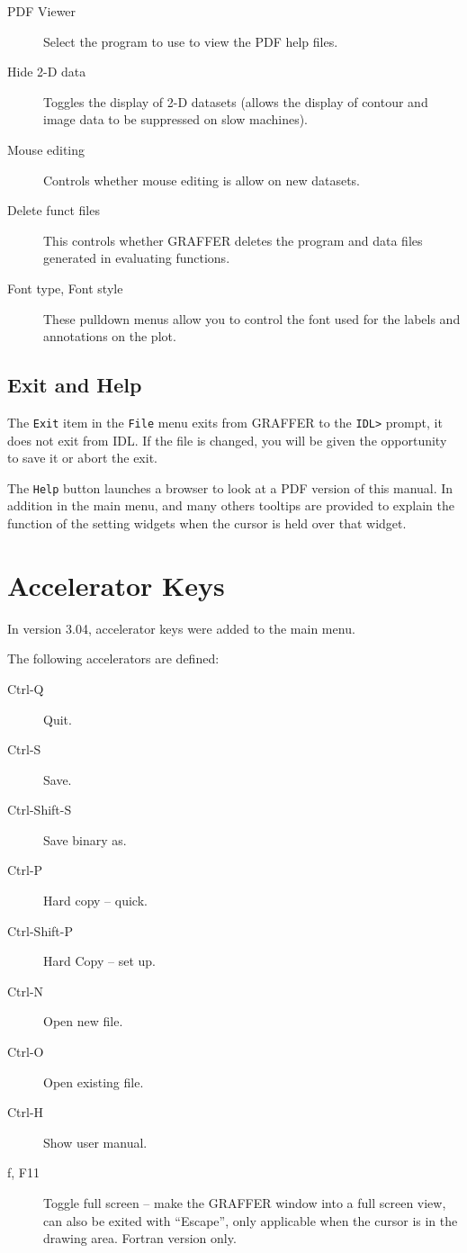 \documentclass[11pt,twoside,english]{article}
\begin{document}
\begin{description}
\item[PDF Viewer] Select the program to use to view the PDF help files.
\item[Hide 2-D data] Toggles the display of 2-D datasets (allows the
  display of contour and image data to be suppressed on slow machines).
\item[Mouse editing] Controls whether mouse editing is allow on
  new datasets.
\item[Delete funct files] This controls whether GRAFFER deletes the
  program and data files generated in evaluating functions.

\item[Font type, Font style] These pulldown menus allow you to control
  the font used for the labels and annotations on the plot.
\end{description}

\subsection{Exit and Help}

The \texttt{Exit} item in the \texttt{File} menu exits from GRAFFER to
the \texttt{IDL>} prompt, it does not exit from IDL. If the file is
changed, you will be given the opportunity to save it or abort the
exit.

The \texttt{Help} button launches a browser to look at a PDF version of
this manual. In addition in the main menu, and many others tooltips are
provided to explain the function of the setting widgets when the cursor
is held over that widget.

\section{Accelerator Keys}
\label{sec:accel}

In version 3.04, accelerator keys were added to the main menu.

The following accelerators are defined:
\begin{description}
\item[Ctrl-Q] Quit.
\item[Ctrl-S] Save.
\item[Ctrl-Shift-S] Save binary as.
\item[Ctrl-P] Hard copy -- quick.
\item[Ctrl-Shift-P] Hard Copy -- set up.
\item[Ctrl-N] Open new file.
\item[Ctrl-O] Open existing file.
\item[Ctrl-H] Show user manual.
\item[f, F11] Toggle full screen -- make the GRAFFER window into a full
  screen view, can also be exited with ``Escape'', only applicable when
  the cursor is in the drawing area. Fortran version only.
\end{description}
\end{document}
